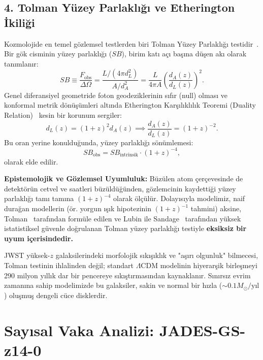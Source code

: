 \documentclass[11pt,a4paper]{article}
\begin{document}
\subsection{4. Tolman Yüzey Parlaklığı ve Etherington İkiliği}
Kozmolojide en temel gözlemsel testlerden biri Tolman Yüzey Parlaklığı testidir~\cite{tolman1930}. Bir gök cisminin yüzey parlaklığı ($SB$), birim katı açı başına düşen akı olarak tanımlanır:
\begin{equation}
    SB \equiv \frac{F_{\mathrm{obs}}}{\Delta \Omega} = \frac{L / (4\pi d_L^2)}{A / d_A^2} = \frac{L}{4\pi A} \left( \frac{d_A(z)}{d_L(z)} \right)^2.
\end{equation}
Genel diferansiyel geometride foton geodeziklerinin sıfır (null) olması ve konformal metrik dönüşümleri altında Etherington Karşılıklılık Teoremi (Duality Relation)~\cite{etherington1933} kesin bir korunum sergiler:
\begin{equation}
    d_L(z) = (1+z)^2 d_A(z) \implies \frac{d_A(z)}{d_L(z)} = (1+z)^{-2}.
    \label{eq:etherington_tam}
\end{equation}
Bu oran yerine konulduğunda, yüzey parlaklığı sönümlemesi:
\begin{equation}
    SB_{\mathrm{obs}} = SB_{\mathrm{intrinsik}} \cdot (1+z)^{-4},
    \label{eq:tolman_tam}
\end{equation}
olarak elde edilir. 

\textbf{Epistemolojik ve Gözlemsel Uyumluluk:} Büzülen atom çerçevesinde de detektörün cetvel ve saatleri büzüldüğünden, gözlemcinin kaydettiği yüzey parlaklığı tamı tamına $(1+z)^{-4}$ olarak ölçülür. Dolayısıyla modelimiz, naif durağan modellerin (ör. yorgun ışık hipotezinin $(1+z)^{-1}$ tahmini) aksine, Tolman~\cite{tolman1930} tarafından formüle edilen ve Lubin ile Sandage~\cite{lubin2001} tarafından yüksek istatistiksel güvenle doğrulanan Tolman yüzey parlaklığı testiyle \textbf{eksiksiz bir uyum içerisindedir.}

JWST yüksek-$z$ galaksilerindeki morfolojik sıkışıklık ve "aşırı olgunluk" bilmecesi, Tolman testinin ihlalinden değil; standart $\Lambda$CDM modelinin hiyerarşik birleşmeyi 290 milyon yıllık dar bir pencereye sıkıştırmasından kaynaklanır. Sınırsız evrim zamanına sahip modelimizde bu galaksiler, sakin ve normal bir hızla ($\sim 0.1 M_\odot/\text{yıl}$) oluşmuş dengeli cüce disklerdir.

\section{Sayısal Vaka Analizi: JADES-GS-z14-0}
\label{sec:vaka_analizi}
\end{document}
